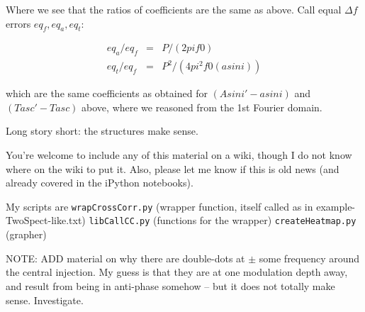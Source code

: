 \documentclass{article}
\begin{document}
Where we see that the ratios of coefficients are the same as above. Call
equal $\Delta f$ errors $eq_f, eq_a, eq_t$:

\begin{eqnarray}
eq_a / eq_f &=& P / (2 pi f0)\\
eq_t / eq_f &=& P^2/(4 pi^2 f0 (a sin i))
\end{eqnarray}

which are the same coefficients as obtained for $(Asini' - a sin i)$ and
$(Tasc' - Tasc)$ above, where we reasoned from the 1st Fourier domain.

Long story short: the structures make sense.

You're welcome to include any of this material on a wiki, though I do
not know where on the wiki to put it. Also, please let me know if this
is old news (and already covered in the iPython notebooks).

My scripts are
    \texttt{wrapCrossCorr.py}
      (wrapper function, itself called as in example-TwoSpect-like.txt)
    \texttt{libCallCC.py}
      (functions for the wrapper)
    \texttt{createHeatmap.py}
      (grapher)

NOTE: ADD material on why there are double-dots at $\pm$ some frequency around the central injection. My guess is that they are at one modulation depth away, and result from being in anti-phase somehow -- but it does not totally make sense. Investigate.
\end{document}

